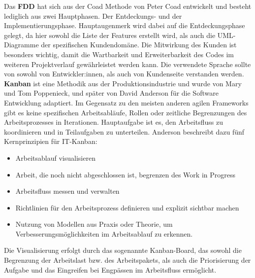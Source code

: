 Das \textbf{FDD} hat sich aus der Coad Methode von Peter Coad entwickelt und besteht lediglich aus zwei Hauptphasen. 
Der Entdeckungs- und der Implementierungsphase. Hauptaugenmerk wird dabei auf die Entdeckungsphase gelegt, da hier sowohl die 
Liste der Features erstellt wird, als auch die UML-Diagramme der spezifischen Kundendomäne. 
Die Mitwirkung des Kunden ist besonders wichtig, damit die Wartbarkeit und Erweiterbarkeit des Codes im weiteren Projektverlauf gewährleistet werden kann. 
Die verwendete Sprache sollte von sowohl von Entwickler:innen, als auch von Kundenseite verstanden werden. \cite{Chowdhury2011-hg} \\

\textbf{Kanban} ist eine Methodik aus der Produktionsindustrie und wurde von Mary und Tom Poppenieck, und später von David Anderson für 
die Software Entwicklung adaptiert. Im Gegensatz zu den meisten anderen agilen Frameworks gibt es keine spezifischen Arbeitsabläufe, 
Rollen oder zeitliche Begrenzungen des Arbeitsprozesses in Iterationen. 
Hauptaufgabe ist es, den Arbeitsfluss zu koordinieren und in Teilaufgaben zu unterteilen. Anderson beschreibt dazu fünf Kernprinzipien für IT-Kanban:

\begin{itemize}
    \item Arbeitsablauf visualisieren
    \item Arbeit, die noch nicht abgeschlossen ist, begrenzen des Work in Progress
    \item Arbeitsfluss messen und verwalten
    \item Richtlinien für den Arbeitsprozess definieren und explizit sichtbar machen
    \item Nutzung von Modellen aus Praxis oder Theorie, um Verbesserungsmöglichkeiten im Arbeitsablauf zu erkennen.
\end{itemize}

Die Visualisierung erfolgt durch das sogenannte Kanban-Board, das sowohl die Begrenzung der Arbeitslast bzw. des Arbeitspakets, 
als auch die Priorisierung der Aufgabe und das Eingreifen bei Engpässen im Arbeitsfluss ermöglicht. \\
\cite{Ahmad2018-jv,Granulo2019-wm} \\

